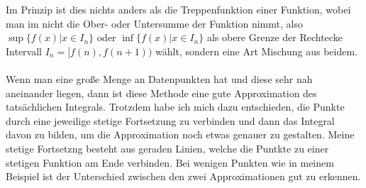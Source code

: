 \documentclass[a4paper,12pt]{article}
\theoremstyle{definition}
\theoremstyle{remark}
\begin{document}
Im Prinzip ist dies nichts anders als die Treppenfunktion einer Funktion, wobei man im nicht 
die Ober- oder Untersumme der Funktion nimmt, also $\sup{\{f(x) | x \in I_n\}}$ oder 
$\inf{\{f(x) | x\in I_n\}}$ als obere Grenze der Rechtecke Intervall $I_n = [f(n), f(n+1))$ 
wählt, sondern eine Art Mischung aus beidem. 
\\ \\
Wenn man eine große Menge an Datenpunkten hat und diese sehr nah aneinander liegen, dann ist 
diese Methode eine gute Approximation des tatsächlichen Integrals. Trotzdem habe ich mich dazu entschieden, 
die Punkte durch eine jeweilige stetige Fortsetzung zu verbinden und dann das Integral davon zu 
bilden, um die Approximation noch etwas genauer zu gestalten. Meine stetige Fortsetzng besteht aus 
geraden Linien, welche die Puntkte zu einer stetigen Funktion am Ende verbinden. Bei wenigen Punkten 
wie in meinem Beispiel ist der Unterschied zwischen den zwei Approximationen gut zu erkennen.
\begin{figure}[h!]
\centering
{}
    \end{figure}
\end{document}
